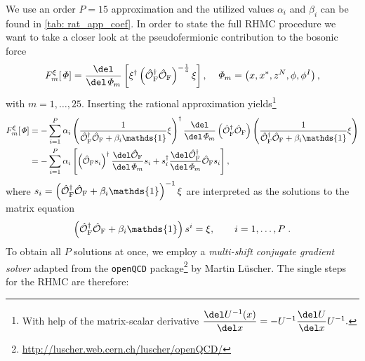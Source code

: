 %
%
We use an order $P=15$ approximation and the utilized values $\alpha_{i}$ and $\beta_{i}$ can be found in \autoref{tab: rat_app_coef}. In order to state the full RHMC procedure we want to take  a closer look at the pseudofermionic contribution to the bosonic force
%
%
\begin{equation}
F_{m}^{\xi}[\mathit{\Phi}] = \frac{\del }{\del \mathit{\Phi}_{m}}\left[ \xi^{\dagger}\left(\hat{\mathcal{O}}_{\rm F}^{\dagger}\hat{\mathcal{O}}_{\rm F}\right)^{-\frac{1}{4}} \xi \right], \quad \mathit{\Phi}_{m} = \left(x,x^{*},z^{N},\phi,\phi^{I}\right),
\end{equation}
%
%
with $ m=1,\ldots,25$. Inserting the rational approximation yields\footnote{With help of the matrix-scalar derivative 
$\dfrac{\del U^{-1}(x)}{\del x} = -U^{-1}\dfrac{\del U}{\del x} U^{-1}.$ \vspace{0.2cm}}
%
%
\begin{equation}
\begin{alignedat}{2}
F_{m}^{\xi}[\mathit{\Phi}] &= - \sum\limits_{i=1}^{P} \alpha_{i} \left(\frac{1}{\hat{\mathcal{O}}_{\rm F}^{\dagger}\hat{\mathcal{O}}_{\rm F}+\beta_{i}\mathds{1}} \xi \right)^{\dagger} \frac{\del }{\del \mathit{\Phi}_{m}}\left(\hat{\mathcal{O}}_{\rm F}^{\dagger}\hat{\mathcal{O}}_{\rm F}\right) \left(\frac{1}{\hat{\mathcal{O}}_{\rm F}^{\dagger}\hat{\mathcal{O}}_{\rm F}+\beta_{i}\mathds{1}} \xi \right) \\
%
%
&= -\sum\limits_{i=1}^{P} \alpha_{i}\left[ \left(\hat{\mathcal{O}}_{\rm F} s_{i}\right)^{\dagger} \frac{\del \hat{\mathcal{O}}_{\rm F}}{\del \mathit{\Phi}_{m}} s_{i} + s_{i}^{\dagger} \frac{\del \hat{\mathcal{O}}_{\rm F}^{\dagger}}{\del \mathit{\Phi}_{m}} \hat{\mathcal{O}}_{\rm F} s_{i} \right],
\end{alignedat}
\end{equation}
%
%
where $s_{i}= \left(\hat{\mathcal{O}}_{\rm F}^{\dagger}\hat{\mathcal{O}}_{\rm F}+\beta_{i}\mathds{1}\right)^{-1}\xi$ are interpreted as the solutions to the matrix equation
%
%
\begin{equation}
\left(\hat{\mathcal{O}}_{\rm F}^{\dagger}\hat{\mathcal{O}}_{\rm F}+\beta_{i}\mathds{1}\right) s^{i} = \xi, \qquad i=1,\ldots,P \;.
\label{eq: mscg}
\end{equation}
%
%
To obtain all $P$ solutions at once, we employ a \textit{multi-shift conjugate gradient solver} adapted from the \texttt{openQCD} package\footnote{\url{http://luscher.web.cern.ch/luscher/openQCD/}} by Martin Lüscher. The single steps for the RHMC are therefore:
%
%
